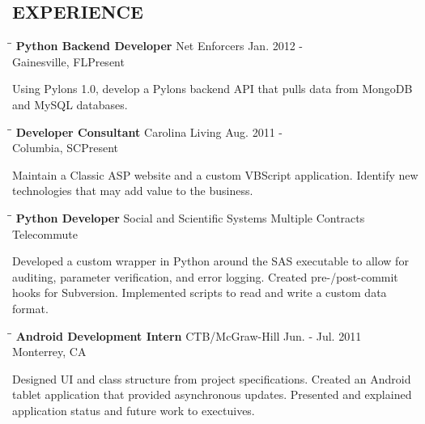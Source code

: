 \documentclass{res}
\begin{document}
\begin{resume}
\section{EXPERIENCE}
   \vspace{-0.1in}	
   \begin{tabbing}
   \hspace{2.3in}\= \hspace{2.6in}\= \kill %
    {\bf Python Backend Developer} \>Net Enforcers     \>Jan. 2012 -\\
                             \>Gainesville, FL\>Present
   \end{tabbing}\vspace{-20pt}      %
   Using Pylons 1.0, develop a Pylons backend API that pulls data from MongoDB and MySQL databases.

   \begin{tabbing}
   \hspace{2.3in}\= \hspace{2.6in}\= \kill %
    {\bf Developer Consultant} \>Carolina Living \>Aug. 2011 - \\
                          \>Columbia, SC\>Present
   \end{tabbing}\vspace{-20pt}
    Maintain a Classic ASP website and a custom VBScript application.  Identify new
    technologies that may add value to the business.

   \begin{tabbing}%
   \hspace{2.3in}\= \hspace{2.6in}\= \kill %
   {\bf Python Developer}  \>Social and Scientific Systems \> Multiple Contracts\\
                          \>Telecommute
   \end{tabbing}\vspace{-20pt}
    Developed a custom wrapper in Python around the SAS executable to allow for 
    auditing, parameter verification, and error logging.  Created pre-/post-commit hooks
    for Subversion.  Implemented scripts to read and write a custom data format.
    
    \begin{tabbing}%
   \hspace{2.3in}\= \hspace{2.6in}\= \kill %
   {\bf Android Development Intern}  \>CTB/McGraw-Hill \> Jun. - Jul. 2011\\
                          \>Monterrey, CA
   \end{tabbing}\vspace{-20pt}
    Designed UI and class structure from project specifications.  Created an Android 
    tablet application that provided asynchronous updates.  Presented and explained
    application status and future work to exectuives.


\end{resume}
\end{document}
